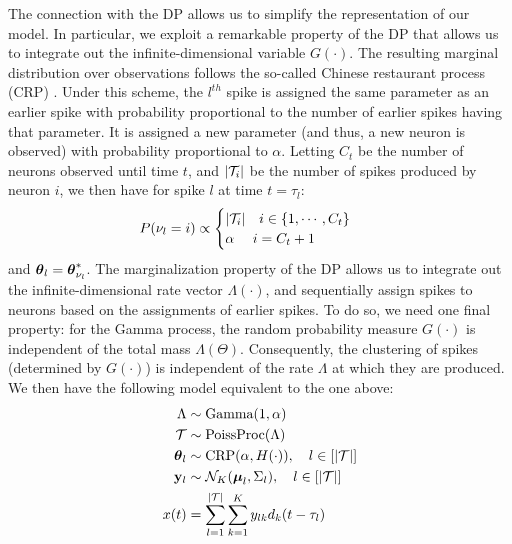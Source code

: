 The connection with the DP allows us to simplify the representation of our model. In particular, we exploit a remarkable property of the DP that
allows us to integrate out the infinite-dimensional variable $G(\cdot)$. The resulting marginal distribution over observations follows the so-called
 Chinese restaurant process (CRP) \citep{Pit2002a}. Under this scheme, the $l^{th}$ spike is assigned the same parameter as an earlier spike with probability 
proportional to the number of earlier spikes having that parameter. It is assigned a new parameter (and thus, a new neuron is observed) with probability 
proportional to $\alpha$. Letting $C_t$ be the number of neurons observed until time $t$, and  $|\mathcal{T}_i|$ be the number of spikes produced by neuron $i$,
we then have for spike $l$ at time $t = \tau_l$: 
\begin{align}
  P({\nu_l} = i) & \propto 
  \begin{cases}
   |\mathcal{T}_i| \quad i \in \{1,\cdots, C_{t}\} \\
   \alpha \quad\ i = C_{t} + 1 \\
  \end{cases}  
\label{eq:crp_marg_pr}
\end{align}
and $\boldsymbol{\theta}_l = \boldsymbol{\theta}^*_{\nu_l}$. 
The marginalization property of the DP allows us to integrate out the infinite-dimensional rate vector $\Lambda(\cdot)$, and sequentially 
assign spikes to neurons based on the assignments of earlier spikes.
To do so, we need one final property: for the Gamma process, the random probability measure $G(\cdot)$ is independent of the total mass $\Lambda(\Theta)$. 
Consequently, the clustering of spikes (determined by $G(\cdot)$) is independent of the rate $\Lambda$ at which they are produced. We then have
 the following model equivalent to the one above:
\begin{subequations}
\begin{align}
  \Lambda & \sim \text{Gamma}(1,\alpha) \\
  \mathcal{T} &\sim \text{PoissProc}(\Lambda) \\
  \boldsymbol{\theta}_l &\sim \text{CRP}(\alpha, H(\cdot)), \quad l \in [|\mathcal{T}|]   \label{eq:CRP}\\
  \mathbf{y}_l &\sim \mathcal{N}_K(\boldsymbol{\mu}_{l}, \Sigma_{l}), \quad  l \in [|\mathcal{T}|]   \label{eq:CRP_mix}\\
  x(t) &=   \sum_{l=1}^{|\mathcal{T}|} \sum_{k=1}^K y_{lk} d_k(t - \tau_{l})
\end{align}
\end{subequations}
